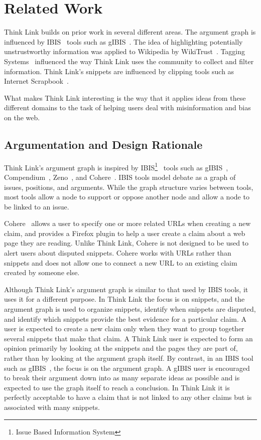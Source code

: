 \documentclass{chi2009}
\newcommand{\todo}[1]{}
\begin{document}
\section{Related Work}
\todo{Don't cite things that aren't relevant}

Think Link builds on prior work in several different areas. The argument graph is influenced by IBIS~\cite{Rittel1973} tools such as gIBIS~\cite{Conklin1987a}. The idea of highlighting potentially unstrustworthy information was applied to Wikipedia by WikiTrust~\cite{Adler2008a}. Tagging Systems~\cite{Marlow2006} influenced the way Think Link uses the community to collect and filter information. Think Link's snippets are influenced by clipping tools such as Internet Scrapbook~\cite{Sugiura1998}.

What makes Think Link interesting is the way that it applies ideas from these different domains to the task of helping users deal with misinformation and bias on the web.

\subsection{Argumentation and Design Rationale}

Think Link's argument graph is inspired by IBIS\footnote{Issue Based Information System}~\cite{Rittel1973} tools such as gIBIS~\cite{Conklin1987a}, Compendium~\cite{Selvin2001}, Zeno~\cite{Gordon1997}, and Cohere~\cite{Shum2008}. IBIS tools model debate as a graph of issues, positions, and arguments. While the graph structure varies between tools, most tools allow a node to support or oppose another node and allow a node to be linked to an issue. 

Cohere~\cite{Shum2008} allows a user to specify one or more related URLs when creating a new claim, and provides a Firefox plugin to help a user create a claim about a web page they are reading. Unlike Think Link, Cohere is not designed to be used to alert users about disputed snippets. Cohere works with URLs rather than snippets and does not allow one to connect a new URL to an existing claim created by someone else. 

Although Think Link's argument graph is similar to that used by IBIS tools, it uses it for a different purpose. In Think Link the focus is on snippets, and the argument graph is used to organize snippets, identify when snippets are disputed, and identify which snippets provide the best evidence for a particular claim. A user is expected to create a new claim only when they want to group together several snippets that make that claim. A Think Link user is expected to form an opinion primarily by looking at the snippets and the pages they are part of, rather than by looking at the argument graph itself. By contrast, in an IBIS tool such as gIBIS~\cite{Conklin1987a}, the focus is on the argument graph. A gIBIS user is encouraged to break their argument down into as many separate ideas as possible and is expected to use the graph itself to reach a conclusion. In Think Link it is perfectly acceptable to have a claim that is not linked to any other claims but is associated with many snippets.
\end{document}
